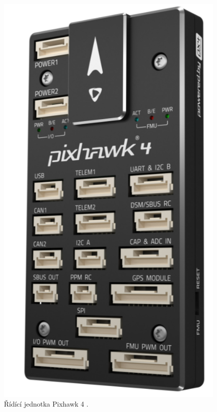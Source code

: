 \begin{figure}[!ht]
    \begin{center}
        \includegraphics[scale=0.47]{obrazky/PIX}
    \end{center}
    \caption[Řídící jednotka Pixhawk 4]{Řídící jednotka Pixhawk 4 \cite{PX4docs}.}
    \label{fig:PIX}
\end{figure}


